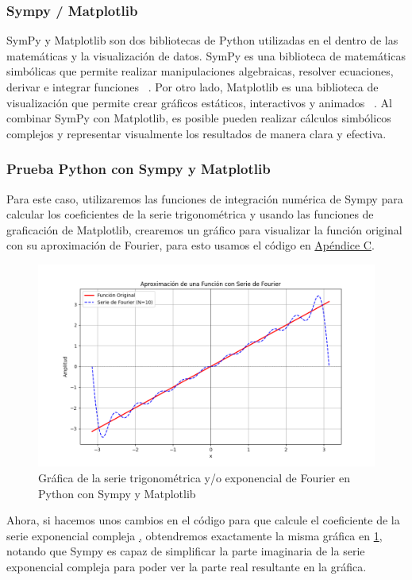 \subsubsection{Sympy / Matplotlib}
SymPy y Matplotlib son dos bibliotecas de Python utilizadas en el dentro de las matemáticas y la visualización de datos. SymPy es una biblioteca de matemáticas simbólicas que permite realizar manipulaciones algebraicas, resolver ecuaciones, derivar e integrar funciones ~\cite{sympy2024}. Por otro lado, Matplotlib es una biblioteca de visualización que permite crear gráficos estáticos, interactivos y animados ~\cite{matplotlib2024}. Al combinar SymPy con Matplotlib, es posible pueden realizar cálculos simbólicos complejos y representar visualmente los resultados de manera clara y efectiva. 
\subsubsection{Prueba Python con Sympy y Matplotlib}
Para este caso, utilizaremos las funciones de integración numérica de Sympy para calcular los coeficientes de la serie trigonométrica y usando las funciones de graficación de Matplotlib, crearemos un gráfico para visualizar la función original con su aproximación de Fourier, para esto usamos el código en \hyperref[app3:complex-code-python-matplotlib-sympy]{Apéndice C}. 
\begin{figure}[H]
	\centering
	\includegraphics[width=1\textwidth]{img/chapter02/python-sympy-matplotlib.png}
	\caption{Gráfica de la serie trigonométrica y/o exponencial de Fourier en Python con Sympy y Matplotlib}
	\label{fig:python-matplotlib-sympy-trig-series}  %
\end{figure}
Ahora, si hacemos unos cambios en el código para que calcule el coeficiente de la serie exponencial compleja \hyperref[app3:complex-code-python-matplotlib-sympy], obtendremos exactamente la misma gráfica en \ref{fig:python-matplotlib-sympy-trig-series}, notando que Sympy es capaz de simplificar la parte imaginaria de la serie exponencial compleja para poder ver la parte real resultante en la gráfica.

